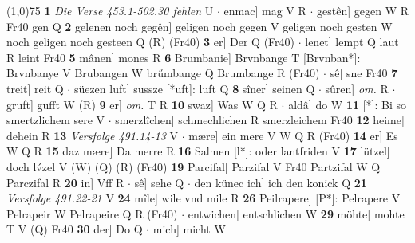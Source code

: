 \documentclass[8pt,a4paper,notitlepage]{article}
\begin{document}
\begin{table}[ht]
\begin{minipage}[t]{0.5\linewidth}
\line(1,0){75} \newline
\textbf{1} \textit{Die Verse 453.1-502.30 fehlen} U   $\cdot$ enmac] mag V R  $\cdot$ gestên] gegen W R Fr40 gen Q \textbf{2} gelenen noch gegên] geligen noch gegen V geligen noch gesten W noch geligen noch gesteen Q (R) (Fr40) \textbf{3} er] Der Q (Fr40)  $\cdot$ lenet] lempt Q laut R leint Fr40 \textbf{5} mânen] mones R \textbf{6} Brumbanie] Brvnbange T [Brvnban*]: Brvnbanye V Brubangen W brűmbange Q Brumbange R (Fr40)  $\cdot$ sê] sne Fr40 \textbf{7} treit] reit Q  $\cdot$ süezen luft] sussze [*uft]: luft Q \textbf{8} sîner] seinen Q  $\cdot$ sûren] \textit{om.} R  $\cdot$ gruft] gufft W (R) \textbf{9} er] \textit{om.} T R \textbf{10} swaz] Was W Q R  $\cdot$ aldâ] do W \textbf{11} [*]: Bi so smertzlichem sere V  $\cdot$ smerzlîchen] schmechlichen R smerzleichem Fr40 \textbf{12} heime] dehein R \textbf{13} \textit{Versfolge 491.14-13} V   $\cdot$ mære] ein mere V W Q R (Fr40) \textbf{14} er] Es W Q R \textbf{15} daz mære] Da merre R \textbf{16} Salmen [l*]: oder lantfriden V \textbf{17} lützel] doch lv́zel V (W) (Q) (R) (Fr40) \textbf{19} Parcifal] Parzifal V Fr40 Partzifal W Q Parczifal R \textbf{20} in] Vff R  $\cdot$ sê] sehe Q  $\cdot$ den künec ich] ich den konick Q \textbf{21} \textit{Versfolge 491.22-21} V  \textbf{24} mîle] wile vnd mile R \textbf{26} Peilrapere] [P*]: Pelrapere V Pelrapeir W Pelrapeire Q R (Fr40)  $\cdot$ entwichen] entschlichen W \textbf{29} möhte] mohte T V (Q) Fr40 \textbf{30} der] Do Q  $\cdot$ mich] micht W \newline
\end{minipage}
\end{table}
\end{document}
